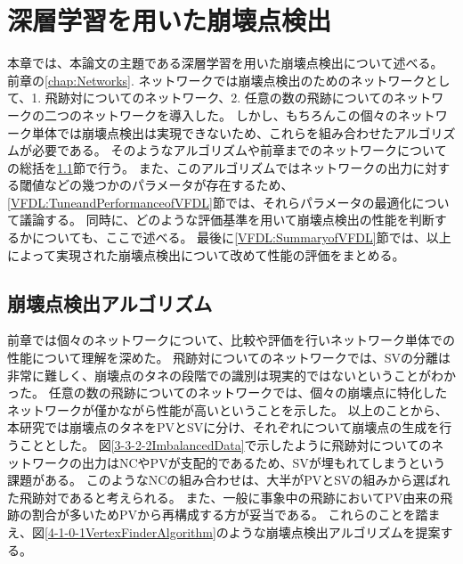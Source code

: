 
\chapter{深層学習を用いた崩壊点検出} \label{chap:VertexFinderwithDL}

本章では、本論文の主題である深層学習を用いた崩壊点検出について述べる。
前章の\ref{chap:Networks}. ネットワークでは崩壊点検出のためのネットワークとして、1. 飛跡対についてのネットワーク、2. 任意の数の飛跡についてのネットワークの二つのネットワークを導入した。
しかし、もちろんこの個々のネットワーク単体では崩壊点検出は実現できないため、これらを組み合わせたアルゴリズムが必要である。
そのようなアルゴリズムや前章までのネットワークについての総括を\ref{VFDL:AlgorithmofVFDL}節で行う。
また、このアルゴリズムではネットワークの出力に対する閾値などの幾つかのパラメータが存在するため、\ref{VFDL:TuneandPerformanceofVFDL}節では、それらパラメータの最適化について議論する。
同時に、どのような評価基準を用いて崩壊点検出の性能を判断するかについても、ここで述べる。
最後に\ref{VFDL:SummaryofVFDL}節では、以上によって実現された崩壊点検出について改めて性能の評価をまとめる。


\section{崩壊点検出アルゴリズム} \label{VFDL:AlgorithmofVFDL}

前章では個々のネットワークについて、比較や評価を行いネットワーク単体での性能について理解を深めた。
飛跡対についてのネットワークでは、SVの分離は非常に難しく、崩壊点のタネの段階での識別は現実的ではないということがわかった。
任意の数の飛跡についてのネットワークでは、個々の崩壊点に特化したネットワークが僅かながら性能が高いということを示した。
以上のことから、本研究では崩壊点のタネをPVとSVに分け、それぞれについて崩壊点の生成を行うこととした。
図\ref{3-3-2-2ImbalancedData}で示したように飛跡対についてのネットワークの出力はNCやPVが支配的であるため、SVが埋もれてしまうという課題がある。
このようなNCの組み合わせは、大半がPVとSVの組みから選ばれた飛跡対であると考えられる。
また、一般に事象中の飛跡においてPV由来の飛跡の割合が多いためPVから再構成する方が妥当である。
これらのことを踏まえ、図\ref{4-1-0-1VertexFinderAlgorithm}のような崩壊点検出アルゴリズムを提案する。

